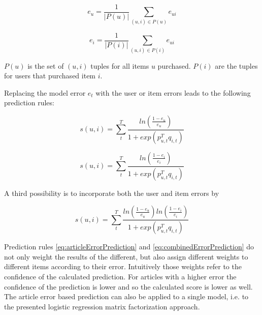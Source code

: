 \documentclass[10pt]{reportMaster}
\begin{document}
\begin{equation}
	\label{eq:userError}
	e_{u} = \frac{1}{|P(u)|} \sum_{(u,i) \in P(u)}{e_{ui}}
\end{equation}

\begin{equation}
	\label{eq:articleError}
	e_{i} = \frac{1}{|P(i)|} \sum_{(u,i) \in P(i)}{e_{ui}}
\end{equation}

$P(u)$ is the set of $(u,i)$ tuples for all items $u$ purchased.
$P(i)$ are the tuples for users that purchased item $i$.

Replacing the model error $e_t$ with the user or item errors leads to the following prediction rules:

\begin{equation}
\label{eq:userErrorPrediction}
	s(u,i) = \sum_t^T{\frac{ln(\frac{1 - e_u}{e_u})}{1 + exp(p_{u,t}^Tq_{i,t})}}
\end{equation}

\begin{equation}
\label{eq:articleErrorPrediction}
s(u,i) = \sum_t^T{\frac{ln(\frac{1 - e_i}{e_i})}{1 + exp(p_{u,t}^Tq_{i,t})}}
\end{equation}

A third possibility is to incorporate both the user and item errors by 

\begin{equation}
\label{eq:combinedErrorPrediction}
s(u,i) = \sum_t^T{\frac{ln(\frac{1 - e_u}{e_u})ln(\frac{1 - e_i}{e_i})}{1 + exp(p_{u,t}^Tq_{i,t})}}
\end{equation}

Prediction rules \ref{eq:articleErrorPrediction} and \ref{eq:combinedErrorPrediction} do not only weight the results of the different, but also assign different weights to different items according to their error.
Intuitively those weights refer to the confidence of the calculated prediction.
For articles with a higher error the confidence of the prediction is lower and so the calculated score is lower as well.
The article error based prediction can also be applied to a single model, i.e. to the presented logistic regression matrix factorization approach.









\end{document}
